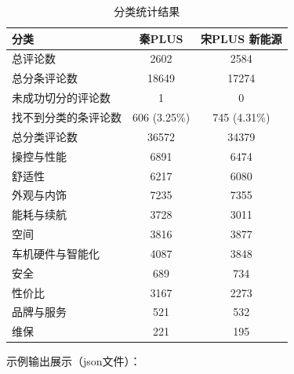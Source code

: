 \documentclass[UTF8,a4paper,15pt,titlepage,oneside]{ctexbook}
\begin{document}
\begin{table}[H]
  \centering
  \begin{tabular}{lcc}
      \toprule
      分类                   & 秦PLUS             & 宋PLUS 新能源     \\
      \midrule
      总评论数              & 2602               & 2584               \\
      总分条评论数          & 18649              & 17274              \\
      未成功切分的评论数    & 1                  & 0                  \\
      找不到分类的条评论数  & 606 (3.25\%)       & 745 (4.31\%)       \\
      总分类评论数          & 36572              & 34379              \\
      操控与性能            & 6891               & 6474               \\
      舒适性                & 6217               & 6080               \\
      外观与内饰            & 7235               & 7355               \\
      能耗与续航            & 3728               & 3011               \\
      空间                  & 3816               & 3877               \\
      车机硬件与智能化      & 4087               & 3848               \\
      安全                  & 689                & 734                \\
      性价比                & 3167               & 2273               \\
      品牌与服务            & 521                & 532                \\
      维保                  & 221                & 195                \\
      \bottomrule
  \end{tabular}
  \caption{分类统计结果}
\end{table}

示例输出展示（json文件）：
\end{document}

